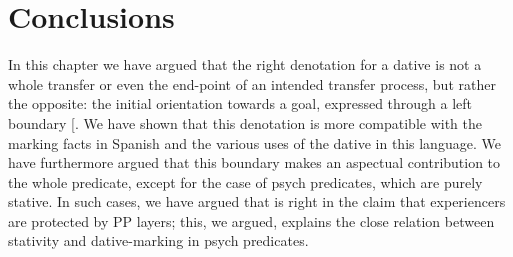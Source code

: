 \documentclass[output=paper,colorlinks,citecolor=brown,nonflat]{./langscibook}
\begin{document}
\section{Conclusions}\label{sec:fabregas:4}

In this chapter we have argued that the right denotation for a dative is not a whole transfer or even the end-point of an intended transfer process, but rather the opposite: the initial orientation towards a goal, expressed through a left boundary [. We have shown that this denotation is more compatible with the marking facts in Spanish and the various uses of the dative in this language. We have furthermore argued that this boundary makes an aspectual contribution to the whole predicate, except for the case of psych predicates, which are purely stative. In such cases, we have argued that \citet{Landau2010} is right in the claim that experiencers are protected by PP layers; this, we argued, explains the close relation between stativity and dative-marking in psych predicates.

\sloppy\printbibliography[heading=subbibliography,notkeyword=this]
\end{document}

